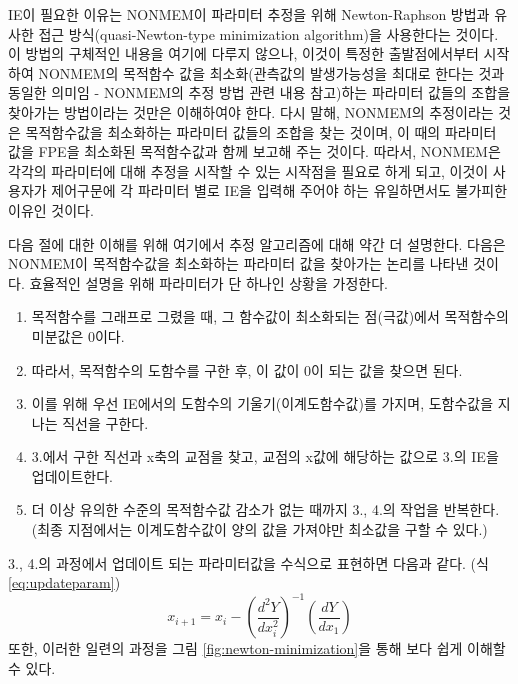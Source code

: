 \documentclass[
  10pt,
  krantz2,
  a4paper]{krantz}
\providecommand{\tightlist}{%
  \setlength{\itemsep}{0pt}\setlength{\parskip}{0pt}}
\theoremstyle{definition}
\theoremstyle{definition}
\theoremstyle{definition}
\theoremstyle{remark}
\begin{document}
IE이 필요한 이유는 NONMEM이 파라미터 추정을 위해 Newton-Raphson 방법과 유사한 접근 방식(quasi-Newton-type minimization algorithm)을 사용한다는 것이다. 이 방법의 구체적인 내용을 여기에 다루지 않으나, 이것이 특정한 출발점에서부터 시작하여 NONMEM의 목적함수 값을 최소화(관측값의 발생가능성을 최대로 한다는 것과 동일한 의미임 - NONMEM의 추정 방법 관련 내용 참고)하는 파라미터 값들의 조합을 찾아가는 방법이라는 것만은 이해하여야 한다. 다시 말해, NONMEM의 추정이라는 것은 목적함수값을 최소화하는 파라미터 값들의 조합을 찾는 것이며, 이 때의 파라미터 값을 FPE을 최소화된 목적함수값과 함께 보고해 주는 것이다. 따라서, NONMEM은 각각의 파라미터에 대해 추정을 시작할 수 있는 시작점을 필요로 하게 되고, 이것이 사용자가 제어구문에 각 파라미터 별로 IE을 입력해 주어야 하는 유일하면서도 불가피한 이유인 것이다.

다음 절에 대한 이해를 위해 여기에서 추정 알고리즘에 대해 약간 더 설명한다. 다음은 NONMEM이 목적함수값을 최소화하는 파라미터 값을 찾아가는 논리를 나타낸 것이다. 효율적인 설명을 위해 파라미터가 단 하나인 상황을 가정한다.

\begin{enumerate}
\def\labelenumi{\arabic{enumi}.}
\tightlist
\item
  목적함수를 그래프로 그렸을 때, 그 함수값이 최소화되는 점(극값)에서 목적함수의 미분값은 0이다. 
\item
  따라서, 목적함수의 도함수를 구한 후, 이 값이 0이 되는 값을 찾으면 된다. 
\item
  이를 위해 우선 IE에서의 도함수의 기울기(이계도함수값)를 가지며, 도함수값을 지나는 직선을 구한다. 
\item
  3.에서 구한 직선과 x축의 교점을 찾고, 교점의 x값에 해당하는 값으로 3.의 IE을 업데이트한다.
\item
  더 이상 유의한 수준의 목적함수값 감소가 없는 때까지 3., 4.의 작업을 반복한다. (최종 지점에서는 이계도함수값이 양의 값을 가져야만 최소값을 구할 수 있다.)
\end{enumerate}

3., 4.의 과정에서 업데이트 되는 파라미터값을 수식으로 표현하면 다음과 같다. (식 \eqref{eq:updateparam})
\begin{equation}
x_{i+1} = x_i - (\frac{d^2Y}{dx_i^2})^{-1}(\frac{dY}{dx_1})
\label{eq:updateparam}
\end{equation}
또한, 이러한 일련의 과정을 그림 \ref{fig:newton-minimization}을 통해 보다 쉽게 이해할 수 있다.
\end{document}

